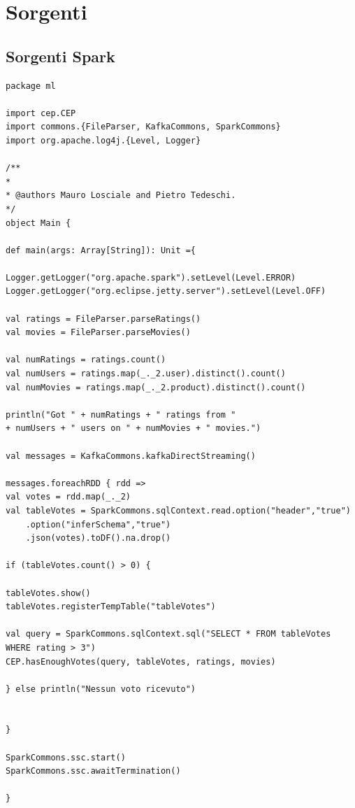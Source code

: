 \documentclass[12pt]{article}
\begin{document}
\clearpage
{}
\nocite{*}



\newpage
\section{Sorgenti}
\begin{appendices}
	\section{Sorgenti Spark}
	\begin{lstlisting}[style=scalacode, caption=Main.scala]
package ml

import cep.CEP
import commons.{FileParser, KafkaCommons, SparkCommons}
import org.apache.log4j.{Level, Logger}

/**
*
* @authors Mauro Losciale and Pietro Tedeschi.
*/
object Main {

def main(args: Array[String]): Unit ={

Logger.getLogger("org.apache.spark").setLevel(Level.ERROR)
Logger.getLogger("org.eclipse.jetty.server").setLevel(Level.OFF)

val ratings = FileParser.parseRatings()
val movies = FileParser.parseMovies()

val numRatings = ratings.count()
val numUsers = ratings.map(_._2.user).distinct().count()
val numMovies = ratings.map(_._2.product).distinct().count()

println("Got " + numRatings + " ratings from "
+ numUsers + " users on " + numMovies + " movies.")

val messages = KafkaCommons.kafkaDirectStreaming()

messages.foreachRDD { rdd =>
val votes = rdd.map(_._2)
val tableVotes = SparkCommons.sqlContext.read.option("header","true")
	.option("inferSchema","true")
	.json(votes).toDF().na.drop()

if (tableVotes.count() > 0) {

tableVotes.show()
tableVotes.registerTempTable("tableVotes")

val query = SparkCommons.sqlContext.sql("SELECT * FROM tableVotes WHERE rating > 3")
CEP.hasEnoughVotes(query, tableVotes, ratings, movies)

} else println("Nessun voto ricevuto")


}

SparkCommons.ssc.start()
SparkCommons.ssc.awaitTermination()

}


\end{lstlisting}
\end{appendices}
\end{document}
